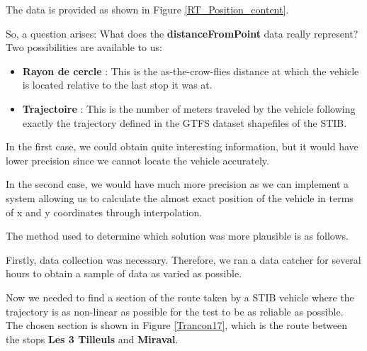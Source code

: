 \documentclass[12pt]{report}
\begin{document}
	The data is provided as shown in Figure \ref{RT_Position_content}.
	
	
	
	So, a question arises: What does the \textbf{distanceFromPoint} data really represent? Two possibilities are available to us:
	
	\begin{center}
		\begin{itemize}[noitemsep]
			\item \textbf{Rayon de cercle} : This is the as-the-crow-flies distance at which the vehicle is located relative to the last stop it was at.
			\item \textbf{Trajectoire} : This is the number of meters traveled by the vehicle following exactly the trajectory defined in the GTFS dataset shapefiles of the STIB.
		\end{itemize}
	\end{center}
	
	In the first case, we could obtain quite interesting information, but it would have lower precision since we cannot locate the vehicle accurately.
	
	In the second case, we would have much more precision as we can implement a system allowing us to calculate the almost exact position of the vehicle in terms of x and y coordinates through interpolation.
	
	The method used to determine which solution was more plausible is as follows.
	
	Firstly, data collection was necessary. Therefore, we ran a data catcher for several hours to obtain a sample of data as varied as possible.
	
	Now we needed to find a section of the route taken by a STIB vehicle where the trajectory is as non-linear as possible for the test to be as reliable as possible. The chosen section is shown in Figure \ref{Trancon17}, which is the route between the stops \textbf{Les 3 Tilleuls} and \textbf{Miraval}.
	
\end{document}
